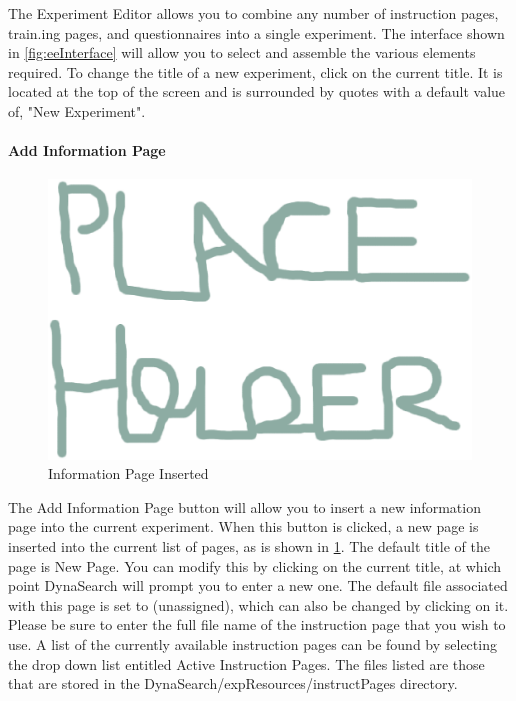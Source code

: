 \documentclass[article]{ij4uq}              %
\begin{document}
The Experiment Editor allows you to combine any number of instruction pages, train.ing pages, and questionnaires into a single experiment. The interface shown in \ref{fig:eeInterface} will allow you to select and assemble the various elements required. To change the title of a new experiment, click on the current title. It is located at the top of the screen and is surrounded by quotes with a default value of, "New Experiment".

\paragraph{Add Information Page}

\begin{figure}[h!]
 \centering
 \includegraphics[width=5.0in]{figures/place.eps}
 \caption{Information Page Inserted}
 \label{fig:infoInsert}
\end{figure}
\FloatBarrier

The Add Information Page button will allow you to insert a new information page into the current experiment. When this button is clicked, a new page is inserted into the current list of pages, as is shown in \ref{fig:infoInsert}. The default title of the page is New Page. You can modify this by clicking on the current title, at which point DynaSearch will prompt you to enter a new one. The default file associated with this page is set to (unassigned), which can also be changed by clicking on it. Please be sure to enter the full file name of the instruction page that you wish to use. A list of the currently available instruction pages can be found by selecting the drop down list entitled Active Instruction Pages. The files listed are those that are stored in the DynaSearch/expResources/instructPages directory.
\end{document}
